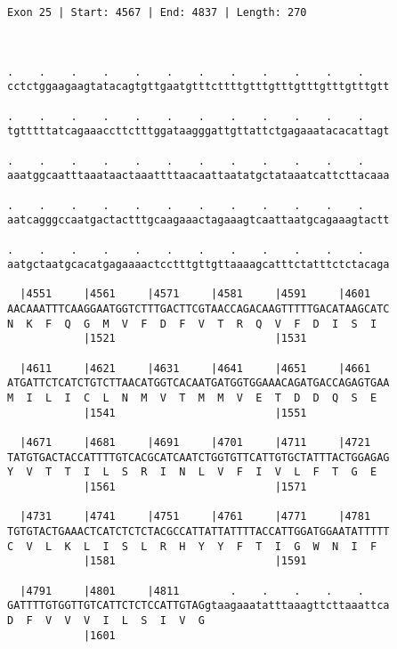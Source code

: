\documentclass{article}
\begin{document}
\begin{Verbatim}
Exon 25 | Start: 4567 | End: 4837 | Length: 270



.    .    .    .    .    .    .    .    .    .    .    .    
cctctggaagaagtatacagtgttgaatgtttcttttgtttgtttgtttgtttgtttgtt
                                                            
.    .    .    .    .    .    .    .    .    .    .    .    
tgtttttatcagaaaccttctttggataagggattgttattctgagaaatacacattagt
                                                            
.    .    .    .    .    .    .    .    .    .    .    .    
aaatggcaatttaaataactaaattttaacaattaatatgctataaatcattcttacaaa
                                                            
.    .    .    .    .    .    .    .    .    .    .    .    
aatcagggccaatgactactttgcaagaaactagaaagtcaattaatgcagaaagtactt
                                                            
.    .    .    .    .    .    .    .    .    .    .    .    
aatgctaatgcacatgagaaaactcctttgttgttaaaagcatttctatttctctacaga
                                                            
  |4551     |4561     |4571     |4581     |4591     |4601   
AACAAATTTCAAGGAATGGTCTTTGACTTCGTAACCAGACAAGTTTTTGACATAAGCATC
N  K  F  Q  G  M  V  F  D  F  V  T  R  Q  V  F  D  I  S  I  
            |1521                         |1531             
  
  |4611     |4621     |4631     |4641     |4651     |4661   
ATGATTCTCATCTGTCTTAACATGGTCACAATGATGGTGGAAACAGATGACCAGAGTGAA
M  I  L  I  C  L  N  M  V  T  M  M  V  E  T  D  D  Q  S  E  
            |1541                         |1551             
  
  |4671     |4681     |4691     |4701     |4711     |4721   
TATGTGACTACCATTTTGTCACGCATCAATCTGGTGTTCATTGTGCTATTTACTGGAGAG
Y  V  T  T  I  L  S  R  I  N  L  V  F  I  V  L  F  T  G  E  
            |1561                         |1571             
  
  |4731     |4741     |4751     |4761     |4771     |4781   
TGTGTACTGAAACTCATCTCTCTACGCCATTATTATTTTACCATTGGATGGAATATTTTT
C  V  L  K  L  I  S  L  R  H  Y  Y  F  T  I  G  W  N  I  F  
            |1581                         |1591             
  
  |4791     |4801     |4811        .    .    .    .    .    
GATTTTGTGGTTGTCATTCTCTCCATTGTAGgtaagaaatatttaaagttcttaaattca
D  F  V  V  V  I  L  S  I  V  G                             
            |1601                                           
  

\end{Verbatim}
\end{document}
